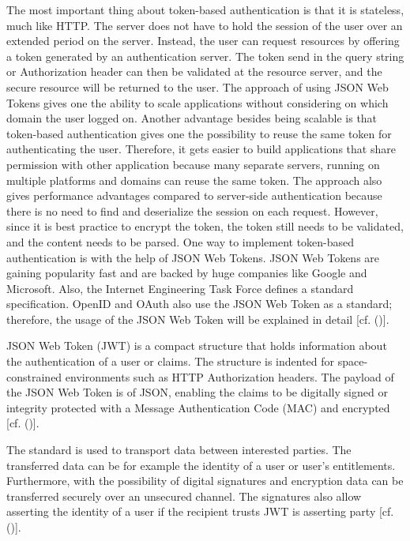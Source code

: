 {The most important thing about token-based authentication is that it is stateless, much like HTTP. The server does not have to hold the session of the user over an extended period on the server. Instead, the user can request resources by offering a token generated by an authentication server. The token send in the query string or Authorization header can then be validated at the resource server, and the secure resource will be returned to the user. The approach of using JSON Web Tokens gives one the ability to scale applications without considering on which domain the user logged on. Another advantage besides being scalable is that token-based authentication gives one the possibility to reuse the same token for authenticating the user. Therefore, it gets easier to build applications that share permission with other application because many separate servers, running on multiple platforms and domains can reuse the same token. The approach also gives performance advantages compared to server-side authentication because there is no need to find and deserialize the session on each request. However, since it is best practice to encrypt the token, the token still needs to be validated, and the content needs to be parsed. One way to implement token-based authentication is with the help of JSON Web Tokens. JSON Web Tokens are gaining popularity fast and are backed by huge companies like Google and Microsoft. Also, the Internet Engineering Task Force defines a standard specification. OpenID and OAuth also use the JSON Web Token as a standard; therefore, the usage of the JSON Web Token will be explained in detail [cf. (\cite{Tkalec:2015})].


JSON Web Token (JWT) is a compact structure that holds information about the authentication of a user or claims. The structure is indented for space-constrained environments such as HTTP Authorization headers. The payload of the JSON Web Token is of JSON, enabling the claims to be digitally signed or integrity protected with a Message Authentication Code (MAC) and encrypted [cf. (\cite{JWT:IETF:Jones:2015})].

The standard is used to transport data between interested parties. The transferred data can be for example the identity of a user or user’s entitlements. Furthermore, with the possibility of digital signatures and encryption data can be transferred securely over an unsecured channel. The signatures also allow asserting the identity of a user if the recipient trusts JWT is asserting party [cf. (\cite{Siriwardena:JWTJWSJWE:2016})].

}
